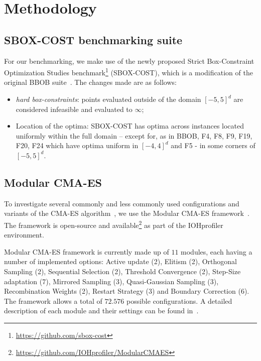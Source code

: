 \documentclass[sigconf=true, nonacm=false, review=true, anonymous = false,screen=true]{acmart}
\begin{document}
\section{Methodology}
\subsection{SBOX-COST benchmarking suite}

For our benchmarking, we make use of the newly proposed Strict Box-Constraint Optimization Studies benchmark\footnote{\url{https://github.com/sbox-cost}} (SBOX-COST), which is a modification of the original BBOB suite~\cite{hansen2020coco}. The changes made are as follows: 
\begin{itemize}
    \item \textit{hard box-constraints}: points evaluated outside of the domain $[-5,5]^d$ are considered infeasible and evaluated to $\infty$;
    \item Location of the optima: SBOX-COST has optima across instances located uniformly within the full domain -- except for, as in BBOB, F4, F8, F9, F19, F20, F24 which have optima uniform in $[-4,4]^d$ and F5 - in some corners of $[-5,5]^d$.
\end{itemize} 

\subsection{Modular CMA-ES}
To investigate several commonly and less commonly used configurations and variants of the CMA-ES algorithm~\cite{Hansen.1996}, we use the Modular CMA-ES framework~\cite{van2017algorithm,de2021tuning}. The framework is open-source and available\footnote{\url{https://github.com/IOHprofiler/ModularCMAES}} as part of the IOHprofiler \cite{doerr2018iohprofiler} environment. 

Modular CMA-ES framework is currently made up of $11$ modules, each having a number of implemented options: Active update (2), Elitism (2), Orthogonal Sampling (2), Sequential Selection (2), Threshold Convergence (2), Step-Size adaptation (7), Mirrored Sampling (3), Quasi-Gaussian Sampling (3), Recombination Weights (2), Restart Strategy (3) and Boundary Correction (6). The framework allows a total of $72.576$ possible configurations. A detailed description of each module and their settings can be found in~\cite{de2021tuning}.
\end{document}
